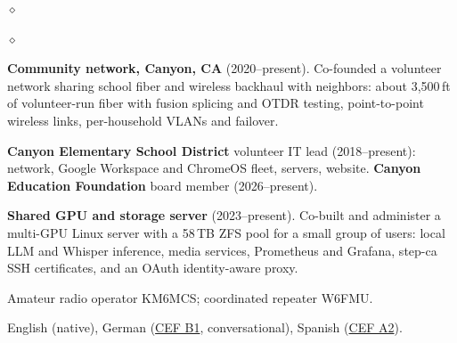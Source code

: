 \documentclass{webster-resume}
\newlength{\secgap}\setlength{\secgap}{0.32cm}
\newcommand{\seclabel}[1]{\llap{{\small\bfseries #1}\hskip\secgap}}
\newcommand{\secsp}{\par\addvspace{0.75em plus 0.2em}}
\newcommand{\rsection}[1]{\secsp\noindent\seclabel{#1}\ignorespaces}
\newcommand{\lsection}[1]{\seclabel{#1}$\diamond$}
\newenvironment{list3}{
  \begin{list}{$\diamond$}{%
      \setlength{\itemsep}{-0.05in}
      \setlength{\parsep}{.05in} \setlength{\parskip}{0in}
      \setlength{\topsep}{0in} \setlength{\partopsep}{0in}
      \setlength{\leftmargin}{0.2in}}}{\end{list}}
\begin{document}
\secsp
\begin{list3}
\item[\lsection{Patents}] 
\end{list3}

\secsp
\begin{list3}
\item[\lsection{Community}] {\bf Community network, Canyon, CA}
  (2020--present).  Co-founded a volunteer network sharing school fiber and
  wireless backhaul with neighbors: about 3,500\,ft of volunteer-run fiber
  with fusion splicing and OTDR testing, point-to-point wireless links,
  per-household VLANs and failover.
\item {\bf Canyon Elementary School District} volunteer IT lead
  (2018--present): network, Google Workspace and ChromeOS fleet, servers,
  website.  {\bf Canyon Education Foundation} board member (2026--present).
\item {\bf Shared GPU and storage server} (2023--present).  Co-built and
  administer a multi-GPU Linux server with a 58\,TB ZFS pool for a small
  group of users: local LLM and Whisper inference, media services,
  Prometheus and Grafana, step-ca SSH certificates, and an OAuth
  identity-aware proxy.
\item Amateur radio operator KM6MCS; coordinated repeater W6FMU.
\end{list3}

\rsection{Languages}%
English (native),
German (\href{https://en.wikipedia.org/wiki/Common_European_Framework_of_Reference_for_Languages}{CEF B1}, conversational),
Spanish (\href{https://en.wikipedia.org/wiki/Common_European_Framework_of_Reference_for_Languages}{CEF A2}).
\end{document}
